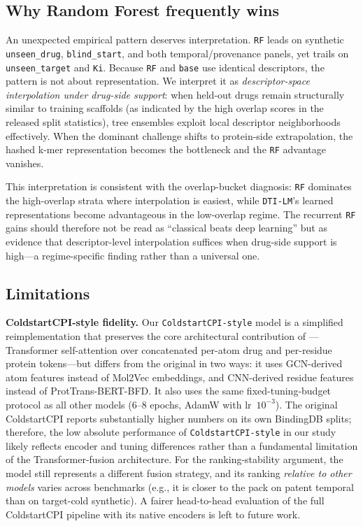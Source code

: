 \documentclass[referee,pdflatex,sn-basic,Numbered]{sn-jnl}
\begin{document}
\subsection{Why Random Forest frequently wins}

An unexpected empirical pattern deserves interpretation. \texttt{RF} leads on synthetic \texttt{unseen\_drug}, \texttt{blind\_start}, and both temporal/provenance panels, yet trails on \texttt{unseen\_target} and \texttt{Ki}. Because \texttt{RF} and \texttt{base} use identical descriptors, the pattern is not about representation. We interpret it as \emph{descriptor-space interpolation under drug-side support}: when held-out drugs remain structurally similar to training scaffolds (as indicated by the high overlap scores in the released split statistics), tree ensembles exploit local descriptor neighborhoods effectively. When the dominant challenge shifts to protein-side extrapolation, the hashed k-mer representation becomes the bottleneck and the \texttt{RF} advantage vanishes.

This interpretation is consistent with the overlap-bucket diagnosis: \texttt{RF} dominates the high-overlap strata where interpolation is easiest, while \texttt{DTI-LM}'s learned representations become advantageous in the low-overlap regime. The recurrent \texttt{RF} gains should therefore not be read as ``classical beats deep learning'' but as evidence that descriptor-level interpolation suffices when drug-side support is high—a regime-specific finding rather than a universal one.

\subsection{Limitations}

\textbf{ColdstartCPI-style fidelity.} Our \texttt{ColdstartCPI-style} model is a simplified reimplementation that preserves the core architectural contribution of \citet{zhao2025coldstartcpi}—Transformer self-attention over concatenated per-atom drug and per-residue protein tokens—but differs from the original in two ways: it uses GCN-derived atom features instead of Mol2Vec embeddings, and CNN-derived residue features instead of ProtTrans-BERT-BFD. It also uses the same fixed-tuning-budget protocol as all other models (6--8 epochs, AdamW with lr~$10^{-3}$). The original ColdstartCPI reports substantially higher numbers on its own BindingDB splits; therefore, the low absolute performance of \texttt{ColdstartCPI-style} in our study likely reflects encoder and tuning differences rather than a fundamental limitation of the Transformer-fusion architecture. For the ranking-stability argument, the model still represents a different fusion strategy, and its ranking \emph{relative to other models} varies across benchmarks (e.g., it is closer to the pack on patent temporal than on target-cold synthetic). A fairer head-to-head evaluation of the full ColdstartCPI pipeline with its native encoders is left to future work.
\end{document}
